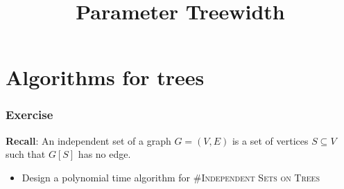 


	
\title[Treewidth]
{Parameter Treewidth}

\begin{frame}
  \titlepage
\end{frame}

\lecturenotes{\maketitle}

\begin{frame}
 \tableofcontents
\end{frame}

\section{Algorithms for trees}

\begin{frame}
 \frametitle{Exercise}
 
  \noindent
 	\textbf{Recall}: An \alert{independent set} of a graph $G=(V,E)$ is a set of vertices $S\subseteq V$ such that $G[S]$ has no edge.
 	
        
        \begin{itemize}
         \item Design a polynomial time algorithm for \#\textsc{Independent Sets on Trees}
        \end{itemize}

\end{frame}


\newcommand{\nbin}{\ensuremath{\mathsf{\#in}}}
\newcommand{\nbout}{\ensuremath{\mathsf{\#out}}}
\newcommand{\nboutD}{\ensuremath{\mathsf{\#outD}}}
\newcommand{\nboutND}{\ensuremath{\mathsf{\#outND}}}


